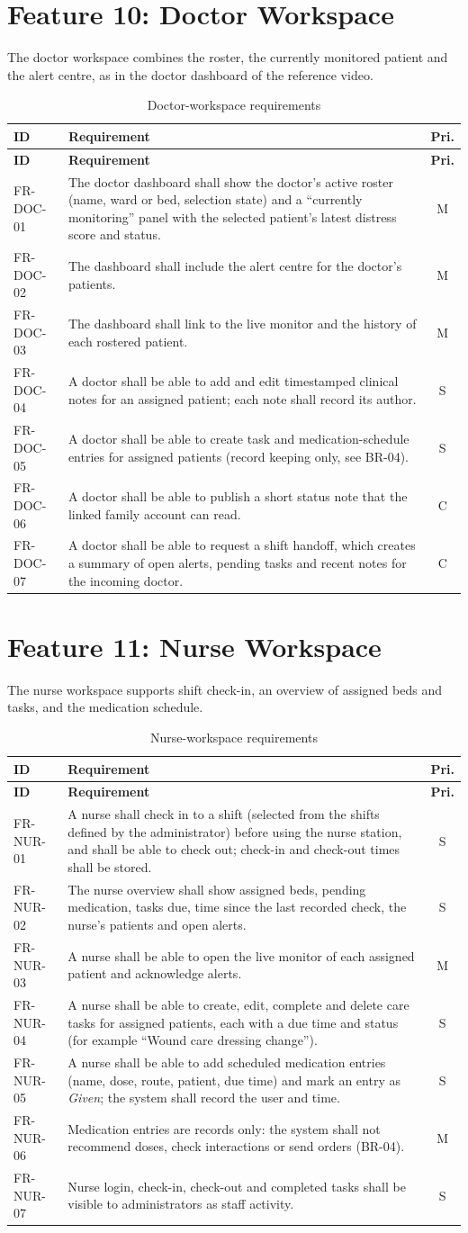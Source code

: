 \documentclass[a4paper,11pt]{scrreprt}
\makeatletter
\newenvironment{reqtable}[1]{%
  \small
  \begin{longtable}{@{}>{\ttfamily\footnotesize}p{2.55cm}>{\raggedright\arraybackslash}p{10.7cm}c@{}}
  \caption{#1}\\
  \toprule \textbf{ID} & \textbf{Requirement} & \textbf{Pri.}\\ \midrule
  \endfirsthead
  \toprule \textbf{ID} & \textbf{Requirement} & \textbf{Pri.}\\ \midrule
  \endhead
  \bottomrule
  \endfoot
}{%
  \end{longtable}\normalsize
}
\newcommand{\req}[3]{#1 & #2 & #3 \\ \midrule}
\makeatother
\begin{document}
\section{Feature 10: Doctor Workspace}
The doctor workspace combines the roster, the currently monitored patient and the alert centre, as in the doctor dashboard of the reference video.
\begin{reqtable}{Doctor-workspace requirements}
\req{FR-DOC-01}{The doctor dashboard shall show the doctor's active roster (name, ward or bed, selection state) and a ``currently monitoring'' panel with the selected patient's latest distress score and status.}{M}
\req{FR-DOC-02}{The dashboard shall include the alert centre for the doctor's patients.}{M}
\req{FR-DOC-03}{The dashboard shall link to the live monitor and the history of each rostered patient.}{M}
\req{FR-DOC-04}{A doctor shall be able to add and edit timestamped clinical notes for an assigned patient; each note shall record its author.}{S}
\req{FR-DOC-05}{A doctor shall be able to create task and medication-schedule entries for assigned patients (record keeping only, see BR-04).}{S}
\req{FR-DOC-06}{A doctor shall be able to publish a short status note that the linked family account can read.}{C}
\req{FR-DOC-07}{A doctor shall be able to request a shift handoff, which creates a summary of open alerts, pending tasks and recent notes for the incoming doctor.}{C}
\end{reqtable}

\section{Feature 11: Nurse Workspace}
The nurse workspace supports shift check-in, an overview of assigned beds and tasks, and the medication schedule.
\begin{reqtable}{Nurse-workspace requirements}
\req{FR-NUR-01}{A nurse shall check in to a shift (selected from the shifts defined by the administrator) before using the nurse station, and shall be able to check out; check-in and check-out times shall be stored.}{S}
\req{FR-NUR-02}{The nurse overview shall show assigned beds, pending medication, tasks due, time since the last recorded check, the nurse's patients and open alerts.}{S}
\req{FR-NUR-03}{A nurse shall be able to open the live monitor of each assigned patient and acknowledge alerts.}{M}
\req{FR-NUR-04}{A nurse shall be able to create, edit, complete and delete care tasks for assigned patients, each with a due time and status (for example ``Wound care dressing change'').}{S}
\req{FR-NUR-05}{A nurse shall be able to add scheduled medication entries (name, dose, route, patient, due time) and mark an entry as \emph{Given}; the system shall record the user and time.}{S}
\req{FR-NUR-06}{Medication entries are records only: the system shall not recommend doses, check interactions or send orders (BR-04).}{M}
\req{FR-NUR-07}{Nurse login, check-in, check-out and completed tasks shall be visible to administrators as staff activity.}{S}
\end{reqtable}
\end{document}
